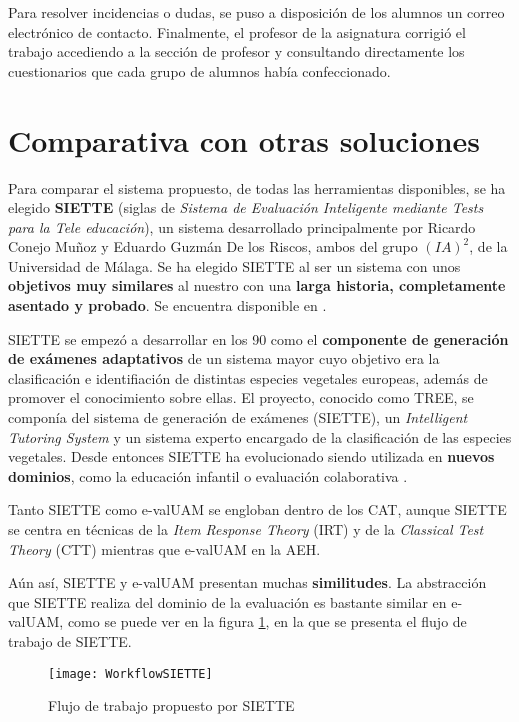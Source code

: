Para resolver incidencias o dudas, se puso a disposición de los alumnos un correo electrónico de contacto. Finalmente, el profesor de la asignatura corrigió el trabajo accediendo a la sección de profesor y consultando directamente los cuestionarios que cada grupo de alumnos había confeccionado.

\section{Comparativa con otras soluciones}

Para comparar el sistema propuesto, de todas las herramientas disponibles, se ha elegido \textbf{SIETTE} (siglas de \textit{Sistema de Evaluación Inteligente mediante Tests para la Tele educación}), un sistema desarrollado principalmente por Ricardo Conejo Muñoz y Eduardo Guzmán De los Riscos, ambos del grupo $(IA)^2$, de la Universidad de Málaga. Se ha elegido SIETTE al ser un sistema con unos \textbf{objetivos muy similares} al nuestro con una \textbf{larga historia, completamente asentado y probado}. Se encuentra disponible en \cite{SIETTE}.

SIETTE se empezó a desarrollar en los 90 como el \textbf{componente de generación de exámenes adaptativos} de un sistema mayor cuyo objetivo era la clasificación e identifiación de distintas especies vegetales europeas, además de promover el conocimiento sobre ellas. El proyecto, conocido como TREE, se componía del sistema de generación de exámenes (SIETTE), un \textit{Intelligent Tutoring System} y un sistema experto encargado de la clasificación de las especies vegetales\cite{Rios98}. Desde entonces SIETTE ha evolucionado siendo utilizada en \textbf{nuevos dominios}, como la educación infantil\cite{Trella08} o evaluación colaborativa \cite{Conejo09}.

Tanto SIETTE como e-valUAM se engloban dentro de los \acrshort{CAT}, aunque SIETTE se centra en técnicas de la \textit{Item Response Theory} (\acrshort{IRT}) y de la \textit{Classical Test Theory} (\acrshort{CTT}) mientras que e-valUAM en la \acrshort{AEH}.

Aún así, SIETTE y e-valUAM presentan muchas \textbf{similitudes}. La abstracción que SIETTE realiza del dominio de la evaluación es bastante similar en e-valUAM, como se puede ver en la figura \ref{fig:SIETTE workflow}, en la que se presenta el flujo de trabajo de SIETTE. 

\begin{figure}[htp!]
	\centering
	\texttt{[image: WorkflowSIETTE]}
	\caption[Flujo de trabajo propuesto por SIETTE]{Flujo de trabajo propuesto por SIETTE\cite{SIETTEWiki}}
	\label{fig:SIETTE workflow}
\end{figure}

